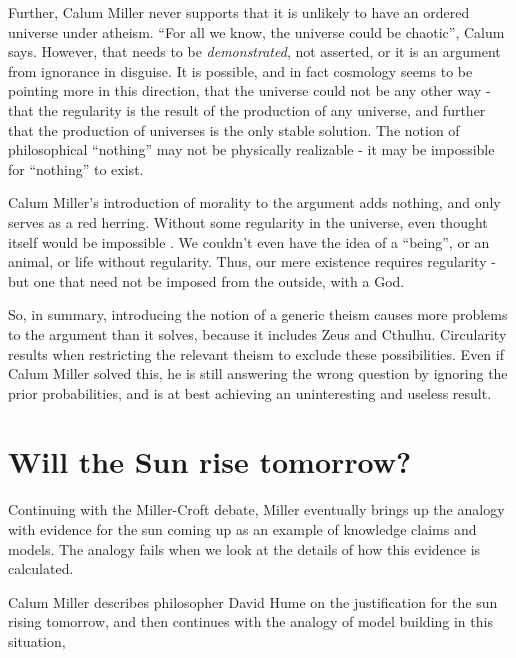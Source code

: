 Further, Calum Miller never supports that it is unlikely to have an ordered universe under atheism. ``For all
we know, the universe could be chaotic'', Calum says. However, that
needs to be \emph{demonstrated}, not asserted, or it is an argument from
ignorance in disguise. It is possible, and in fact cosmology seems to be
pointing more in this direction, that the universe could not be any
other way - that the regularity is the result of the production of any
universe, and further that the production of universes is the only
stable solution. The notion of philosophical ``nothing'' may not be
physically realizable - it may be impossible for ``nothing'' to exist.


Calum Miller's introduction of morality to the argument adds nothing,
and only serves as a red herring. Without some regularity in the
universe, even thought itself would be impossible . We couldn't even
have the idea of a ``being'', or an animal, or life without regularity.
Thus, our mere existence requires regularity - but one that need not be
imposed from the outside, with a God. 

So, in summary, introducing the notion of a generic theism causes more problems to the argument than it solves, because it includes Zeus and Cthulhu. Circularity results when restricting the relevant theism to exclude these possibilities. Even if Calum Miller solved this, he is still answering the wrong question by ignoring the prior probabilities, and is at best achieving an uninteresting and useless result.


\section{Will the Sun rise tomorrow?}

Continuing with the Miller-Croft debate, Miller eventually brings up the analogy with evidence for the sun coming up as an example of knowledge claims and models.  The analogy fails when we look at the details of how this evidence is calculated.

Calum Miller describes philosopher David Hume on the justification for the sun rising tomorrow, and then continues with the analogy of model building in this situation,

